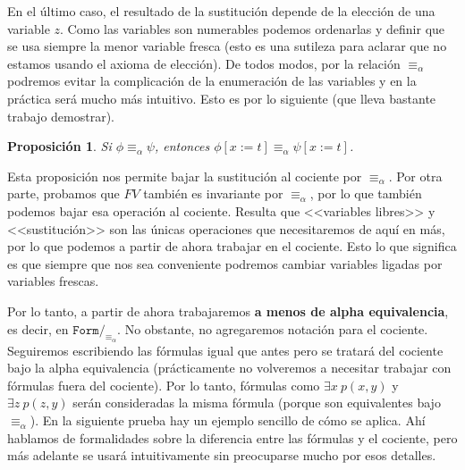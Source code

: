 \documentclass[a4paper, 12pt]{report}
\newtheorem{prop}[teorema]{Proposición}
\theoremstyle{definition}
\begin{document}
En el último caso, el resultado de la sustitución depende de la elección de una variable $z$. Como las variables son numerables podemos ordenarlas y definir que se usa siempre la menor variable fresca (esto es una sutileza para aclarar que no estamos usando el axioma de elección). De todos modos, por la relación $\equiv_\alpha$ podremos evitar la complicación de la enumeración de las variables y en la práctica será mucho más intuitivo. Esto es por lo siguiente (que lleva bastante trabajo demostrar).
\begin{prop}
	Si $\phi\equiv_\alpha\psi$, entonces $\phi[x:=t]\equiv_\alpha\psi[x:=t]$.
\end{prop}
Esta proposición nos permite bajar la sustitución al cociente por $\equiv_\alpha$. Por otra parte, probamos que $FV$ también es invariante por $\equiv_\alpha$, por lo que también podemos bajar esa operación al cociente. Resulta que <<variables libres>> y <<sustitución>> son las únicas operaciones que necesitaremos de aquí en más, por lo que podemos a partir de ahora trabajar en el cociente. Esto lo que significa es que siempre que nos sea conveniente podremos cambiar variables ligadas por variables frescas.

Por lo tanto, a partir de ahora trabajaremos \textbf{a menos de alpha equivalencia}, es decir, en $\mathtt{Form}/_{\equiv_\alpha}$. No obstante, no agregaremos notación para el cociente. Seguiremos escribiendo las fórmulas igual que antes pero se tratará del cociente bajo la alpha equivalencia (prácticamente no volveremos a necesitar trabajar con fórmulas fuera del cociente). Por lo tanto, fórmulas como $\exists x ~p(x,y)$ y $\exists z~p(z,y)$ serán consideradas la misma fórmula (porque son equivalentes bajo $\equiv_\alpha$). En la siguiente prueba hay un ejemplo sencillo de cómo se aplica. Ahí hablamos de formalidades sobre la diferencia entre las fórmulas y el cociente, pero más adelante se usará intuitivamente sin preocuparse mucho por esos detalles.
\end{document}
